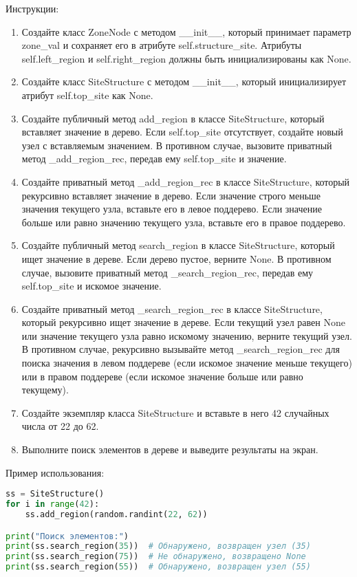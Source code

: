 \begin{enumerate}
Инструкции:
\begin{enumerate}
    \item Создайте класс ZoneNode с методом \_\_init\_\_, который принимает параметр zone\_val и сохраняет его в атрибуте self.structure\_site. Атрибуты self.left\_region и self.right\_region должны быть инициализированы как None.
    \item Создайте класс SiteStructure с методом \_\_init\_\_, который инициализирует атрибут self.top\_site как None.
    \item Создайте публичный метод add\_region в классе SiteStructure, который вставляет значение в дерево. Если self.top\_site отсутствует, создайте новый узел с вставляемым значением. В противном случае, вызовите приватный метод \_add\_region\_rec, передав ему self.top\_site и значение.
    \item Создайте приватный метод \_add\_region\_rec в классе SiteStructure, который рекурсивно вставляет значение в дерево. Если значение строго меньше значения текущего узла, вставьте его в левое поддерево. Если значение больше или равно значению текущего узла, вставьте его в правое поддерево.
    \item Создайте публичный метод search\_region в классе SiteStructure, который ищет значение в дереве. Если дерево пустое, верните None. В противном случае, вызовите приватный метод \_search\_region\_rec, передав ему self.top\_site и искомое значение.
    \item Создайте приватный метод \_search\_region\_rec в классе SiteStructure, который рекурсивно ищет значение в дереве. Если текущий узел равен None или значение текущего узла равно искомому значению, верните текущий узел. В противном случае, рекурсивно вызывайте метод \_search\_region\_rec для поиска значения в левом поддереве (если искомое значение меньше текущего) или в правом поддереве (если искомое значение больше или равно текущему).
    \item Создайте экземпляр класса SiteStructure и вставьте в него 42 случайных числа от 22 до 62.
    \item Выполните поиск элементов в дереве и выведите результаты на экран.
\end{enumerate}

Пример использования:
\begin{lstlisting}[language=Python]
ss = SiteStructure()
for i in range(42):
    ss.add_region(random.randint(22, 62))

print("Поиск элементов:")
print(ss.search_region(35))  # Обнаружено, возвращен узел (35)
print(ss.search_region(75))  # Не обнаружено, возвращено None
print(ss.search_region(55))  # Обнаружено, возвращен узел (55)
\end{lstlisting}


\end{enumerate}
